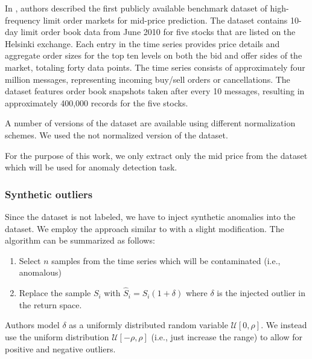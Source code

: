 \documentclass[a4paper, twoside]{report}
\theoremstyle{definition}
\numberwithin{equation}{section}
\begin{document}
In \cite{1705.03233}, authors described the first publicly available benchmark dataset of high-frequency limit order markets for mid-price prediction.
The dataset contains 10-day limit order book data from June 2010 for five stocks that are listed on the Helsinki exchange.
Each entry in the time series provides price details and aggregate order sizes for the top ten levels on both the bid and offer sides of the market,
totaling forty data points. The time series consists of approximately four million messages, representing incoming buy/sell orders or cancellations.
The dataset features order book snapshots taken after every 10 messages, resulting in approximately 400,000 records for the five stocks.

A number of versions of the dataset are available using different normalization schemes. We used the not normalized version of the dataset.

For the purpose of this work, we only extract only the mid price from the dataset which will be used for anomaly detection task.


\subsubsection{Synthetic outliers}

Since the dataset is not labeled, we have to inject synthetic anomalies into the dataset.
We employ the approach similar to \cite{Crepey2022Anomaly} with a slight modification.
The algorithm can be summarized as follows:
\begin{enumerate}
    \item Select $n$ samples from the time series which will be contaminated (i.e., anomalous)
    \item Replace the sample $S_i$ with $\hat{S}_i=S_i(1+\delta)$ where $\delta$ is the injected outlier in the return space.
\end{enumerate}

Authors model $\delta$ as a uniformly distributed random variable $\mathcal{U}[0, \rho]$.
We instead use the uniform distribution $\mathcal{U}[-\rho, \rho]$ (i.e., just increase the range)
to allow for positive and negative outliers.
\end{document}
